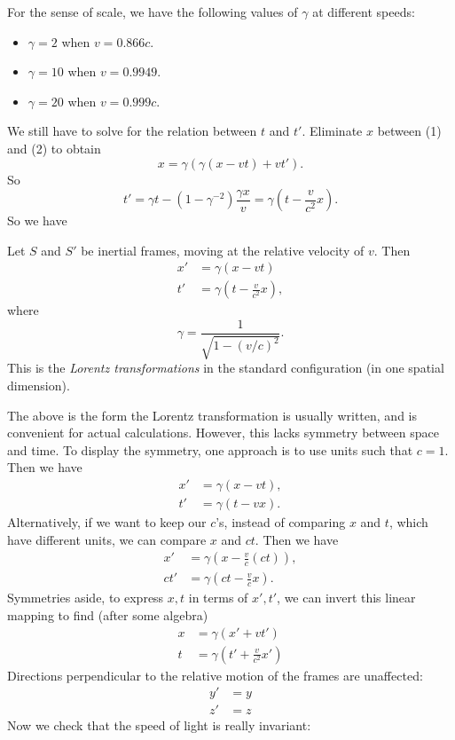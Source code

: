 \documentclass[a4paper]{article}
\begin{document}
For the sense of scale, we have the following values of $\gamma$ at different speeds:
\begin{itemize}
  \item $\gamma = 2$ when $v = 0.866c$.
  \item $\gamma = 10$ when $v = 0.9949$.
  \item $\gamma = 20$ when $v = 0.999c$.
\end{itemize}

We still have to solve for the relation between $t$ and $t'$. Eliminate $x$ between (1) and (2) to obtain
\[
  x = \gamma(\gamma(x - vt) + vt').
\]
So
\[
  t' = \gamma t - (1 - \gamma^{-2})\frac{\gamma x}{v} = \gamma\left(t - \frac{v}{c^2}x\right).
\]
So we have
\begin{law}
  Let $S$ and $S'$ be inertial frames, moving at the relative velocity of $v$. Then
  \begin{align*}
    x' &= \gamma(x - vt)\\
    t' &= \gamma\left(t - \frac{v}{c^2}x\right),
  \end{align*}
  where
  \[
    \gamma = \frac{1}{\sqrt{1 - (v/c)^2}}.
  \]
  This is the \emph{Lorentz transformations} in the standard configuration (in one spatial dimension).
\end{law}
The above is the form the Lorentz transformation is usually written, and is convenient for actual calculations. However, this lacks symmetry between space and time. To display the symmetry, one approach is to use units such that $c = 1$. Then we have
\begin{align*}
  x' &= \gamma(x - vt),\\
  t' &= \gamma(t - vx).
\end{align*}
Alternatively, if we want to keep our $c$'s, instead of comparing $x$ and $t$, which have different units, we can compare $x$ and $ct$. Then we have
\begin{align*}
  x' &= \gamma\left(x - \frac{v}{c}(ct)\right),\\
  ct' &= \gamma\left(ct - \frac{v}{c}x\right).
\end{align*}
Symmetries aside, to express $x, t$ in terms of $x', t'$, we can invert this linear mapping to find (after some algebra)
\begin{align*}
  x &= \gamma(x' + vt')\\
  t &= \gamma\left(t' + \frac{v}{c^2}x'\right)
\end{align*}
Directions perpendicular to the relative motion of the frames are unaffected:
\begin{align*}
  y' &= y\\
  z' &= z
\end{align*}
Now we check that the speed of light is really invariant:
\end{document}
